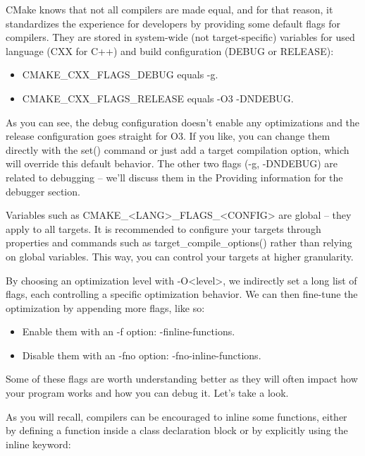 CMake knows that not all compilers are made equal, and for that reason, it standardizes the experience for developers by providing some default flags for compilers. They are stored in system-wide (not target-specific) variables for used language (CXX for C++) and build configuration (DEBUG or RELEASE):

\begin{itemize}
\item 
CMAKE\_CXX\_FLAGS\_DEBUG equals -g.

\item 
CMAKE\_CXX\_FLAGS\_RELEASE equals -O3 -DNDEBUG.
\end{itemize}

As you can see, the debug configuration doesn't enable any optimizations and the release configuration goes straight for O3. If you like, you can change them directly with the set() command or just add a target compilation option, which will override this default behavior. The other two flags (-g, -DNDEBUG) are related to debugging – we'll discuss them in the Providing information for the debugger section.

Variables such as CMAKE\_<LANG>\_FLAGS\_<CONFIG> are global – they apply to all targets. It is recommended to configure your targets through properties and commands such as target\_compile\_options() rather than relying on global variables. This way, you can control your targets at higher granularity.

By choosing an optimization level with -O<level>, we indirectly set a long list of flags, each controlling a specific optimization behavior. We can then fine-tune the optimization by appending more flags, like so:

\begin{itemize}
\item 
Enable them with an -f option: -finline-functions.
	
\item 
Disable them with an -fno option: -fno-inline-functions.
\end{itemize}

Some of these flags are worth understanding better as they will often impact how your program works and how you can debug it. Let's take a look.


As you will recall, compilers can be encouraged to inline some functions, either by defining a function inside a class declaration block or by explicitly using the inline keyword:

